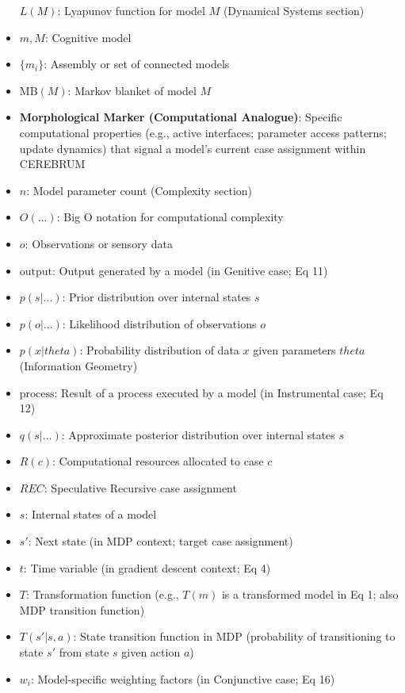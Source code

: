 \begin{itemize}
  \(L(M)\): Lyapunov function for model \(M\) (Dynamical Systems
  section)
\item
  \(m, M\): Cognitive model
\item
  \(\{m_i\}\): Assembly or set of connected models
\item
  \(\text{MB}(M)\): Markov blanket of model \(M\)
\item
  \textbf{Morphological Marker (Computational Analogue)}: Specific
  computational properties (e.g., active interfaces; parameter access
  patterns; update dynamics) that signal a model's current case
  assignment within CEREBRUM
\item
  \(n\): Model parameter count (Complexity section)
\item
  \(O(...)\): Big O notation for computational complexity
\item
  \(o\): Observations or sensory data
\item
  \(\text{output}\): Output generated by a model (in Genitive case; Eq
  11)
\item
  \(p(s|...)\): Prior distribution over internal states \(s\)
\item
  \(p(o|...)\): Likelihood distribution of observations \(o\)
\item
  \(p(x|theta)\): Probability distribution of data \(x\) given
  parameters \(theta\) (Information Geometry)
\item
  \(\text{process}\): Result of a process executed by a model (in
  Instrumental case; Eq 12)
\item
  \(q(s|...)\): Approximate posterior distribution over internal states
  \(s\)
\item
  \(R(c)\): Computational resources allocated to case \(c\)
\item
  \(REC\): Speculative Recursive case assignment
\item
  \(s\): Internal states of a model
\item
  \(s'\): Next state (in MDP context; target case assignment)
\item
  \(t\): Time variable (in gradient descent context; Eq 4)
\item
  \(T\): Transformation function (e.g., \(T(m)\) is a transformed model
  in Eq 1; also MDP transition function)
\item
  \(T(s'|s,a)\): State transition function in MDP (probability of
  transitioning to state \(s'\) from state \(s\) given action \(a\))
\item
  \(w_i\): Model-specific weighting factors (in Conjunctive case; Eq 16)

\end{itemize}
